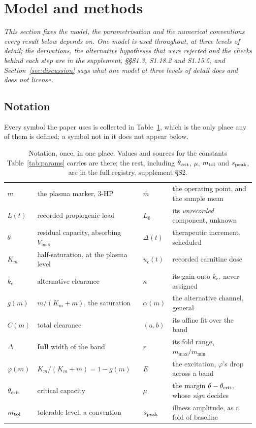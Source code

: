 \section{Model and methods}
\label{sec:model}

\emph{This section fixes the model, the parametrisation and the numerical conventions every
result below depends on. One model is used throughout, at three levels of detail; the
derivations, the alternative hypotheses that were rejected and the checks behind each step
are in the supplement, \S\S S1.3, S1.18.2 and S1.15.5, and Section~\ref{sec:discussion}
says what one model at three
levels of detail does and does not license.}

\subsection{Notation}

Every symbol the paper uses is collected in Table~\ref{tab:notation}, which is the only
place any of them is defined; a symbol not in it does not appear below.

\begin{table}[htbp]
\centering
\footnotesize
\caption{\label{tab:notation}Notation, once, in one place. Values and sources for the
constants Table~\ref{tab:params} carries are there; the rest, including $\theta_{\mathrm{crit}}$, $\mu$,
$m_{\mathrm{tol}}$ and $s_{\mathrm{peak}}$, are in the full registry, supplement \S S2.}
\begin{tabular}{@{}ll@{\hskip 2em}ll@{}}
\toprule
$m$ & the plasma marker, 3-HP & $\bar m$ & the operating point, and the sample mean \\
$L(t)$ & recorded propiogenic load & $L_0$ & its \emph{unrecorded} component, unknown \\
$\theta$ & residual capacity, absorbing $V_{\max}$ & $\Delta(t)$ & therapeutic increment,
scheduled \\
$K_m$ & half-saturation, at the plasma level & $u_c(t)$ & recorded carnitine dose \\
$k_e$ & alternative clearance & $\kappa$ & its gain onto $k_e$, never assigned \\
$g(m)$ & $m/(K_m+m)$, the saturation & $\alpha(m)$ & the alternative channel, general \\
$C(m)$ & total clearance & $(a,b)$ & its affine fit over the band \\
$\Delta$ & \textbf{full} width of the band & $r$ & its fold range, $m_{\max}/m_{\min}$ \\
$\varphi(m)$ & $K_m/(K_m+m) = 1-g(m)$ & $E$ & the excitation, $\varphi$'s drop across a
band \\
$\theta_{\mathrm{crit}}$ & critical capacity & $\mu$ & the margin $\theta - \theta_{\mathrm{crit}}$, whose \emph{sign} decides \\
$m_{\mathrm{tol}}$ & tolerable level, a convention & $s_{\mathrm{peak}}$ & illness amplitude, as a fold of baseline \\
\bottomrule
\end{tabular}
\end{table}


